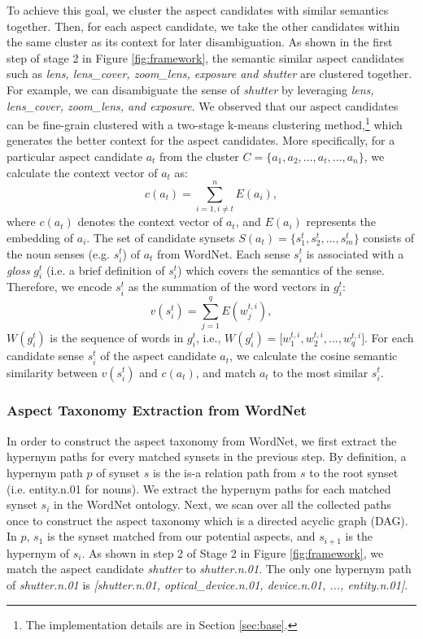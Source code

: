 \documentclass[11pt,a4paper]{article}
\newcommand{\secref}[1]{Section \ref{#1}}
\newcommand{\figref}[1]{Figure \ref{#1}}
\begin{document}
To achieve this goal, we cluster
the aspect candidates with similar semantics together.
Then, for each aspect candidate, 
we take the other candidates within the same cluster
as its context for later disambiguation.
As shown in the first step of stage 2 in \figref{fig:framework}, 
the semantic similar aspect candidates such as 
{\em lens, lens\_cover, zoom\_lens, exposure and shutter}
are clustered together.
For example, we can disambiguate the sense of \emph{shutter} by 
leveraging {\em lens, lens\_cover, zoom\_lens, and exposure}.
We observed that our aspect candidates can be fine-grain 
clustered with a two-stage k-means clustering 
method,\footnote{The implementation details are in \secref{sec:base}.}
which generates the better context for the 
aspect candidates.  More specifically, for a particular aspect candidate $a_t$ 
from the cluster $C = \lbrace a_1, a_2, ..., a_t, ..., a_n \rbrace$, 
we calculate the context vector of $a_t$ as:
\begin{equation}
c(a_t) = \sum_{i=1, i\neq t}^{n} E(a_i),
\end{equation}
where $c(a_t)$ denotes the context vector of $a_t$, 
and $E(a_i)$ represents the embedding of $a_i$.
The set of candidate synsets 
$S(a_t) = \lbrace s^t_1, s^t_2, ..., s^t_m \rbrace$ 
consists of the noun senses (e.g. $s^t_i$) of $a_t$  from WordNet.
Each sense $s^t_i$ is associated with a \emph{gloss} $g^t_i$
(i.e. a brief definition of $s^t_i$) which 
covers the semantics of the sense.
Therefore, we encode $s^t_i$ as the summation
of the word vectors in $g^t_i$:
\begin{equation}
\label{gloss_vec}
v(s^t_i) = \sum_{j=1}^{q} E(w^{t,i}_j),
\end{equation}
$W(g^t_i)$ is the sequence of words in $g^t_i$, i.e., 
$W(g^t_i) = \lbrack w^{t,i}_1, w^{t,i}_2, ..., w^{t,i}_q \rbrack$.
For each candidate sense $s^t_i$ of 
the aspect candidate $a_t$,
we calculate the cosine semantic similarity
between $v(s^t_i)$ and $c(a_t)$, and
match $a_t$ to the most similar $s^t_i$.

\subsubsection{Aspect Taxonomy Extraction from WordNet}
\label{wordnet}
In order to construct the aspect taxonomy from WordNet,
we first extract the hypernym paths for every matched synsets
in the previous step.
By definition, 
a hypernym path $p$ of synset $s$ is the is-a relation path 
from $s$ to the root synset (i.e. entity.n.01 for nouns).
We extract the hypernym paths for each matched synset $s_i$ 
in the WordNet ontology.
Next, we scan over all the collected paths once to construct
the aspect taxonomy which is a directed acyclic graph (DAG).
In $p$, $s_1$ is the synset matched from our potential aspects,
and $s_{i+1}$ is the hypernym of $s_i$.
As shown in step 2 of Stage 2 in \figref{fig:framework},
we match the aspect candidate \emph{shutter} to \emph{shutter.n.01}.
The only one hypernym path of \emph{shutter.n.01} is 
\emph{[shutter.n.01, optical\_device.n.01, device.n.01, ..., entity.n.01]}.
\end{document}
